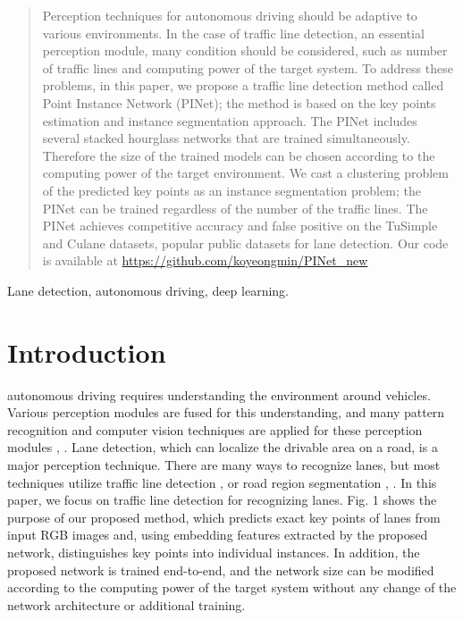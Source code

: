 \documentclass[journal]{IEEEtran}
\begin{document}
\maketitle
\begin{abstract}
Perception techniques for autonomous driving should be adaptive to various environments. In the case of traffic line detection, an essential perception module, many condition should be considered, such as number of traffic lines and computing power of the target system. To address these problems, in this paper, we propose a traffic line detection method called Point Instance Network (PINet); the method is based on the key points estimation and instance segmentation approach. The PINet includes several stacked hourglass networks that are trained simultaneously. Therefore the size of the trained models can be chosen according to the computing power of the target environment. We cast a clustering problem of the predicted key points as an instance segmentation problem; the PINet can be trained regardless of the number of the traffic lines. The PINet achieves competitive accuracy and false positive on the TuSimple and Culane datasets, popular public datasets for lane detection. Our code is available at
\url{https://github.com/koyeongmin/PINet_new}
\end{abstract}

\begin{IEEEkeywords}
Lane detection, autonomous driving, deep learning.
\end{IEEEkeywords}






\IEEEpeerreviewmaketitle



\section{Introduction}
 autonomous driving requires understanding the environment around vehicles. Various perception modules are fused for this understanding, and many pattern recognition and computer vision techniques are applied for these perception modules \cite{lee2019snider}, \cite{munir2019localization}. Lane detection, which can localize the drivable area on a road, is a major perception technique. There are many ways to recognize lanes, but most techniques utilize traffic line detection \cite{wang2004lane}, \cite{kim2008robust} or road region segmentation \cite{LI20161}, \cite{wang2019self}. In this paper, we focus on traffic line detection for recognizing lanes. Fig. 1 shows the purpose of our proposed method, which predicts exact key points of lanes from input RGB images and, using embedding features extracted by the proposed network, distinguishes key points into individual instances. In addition, the proposed network is trained end-to-end, and the network size can be modified according to the computing power of the target system without any change of the network architecture or additional training. 
\end{document}

